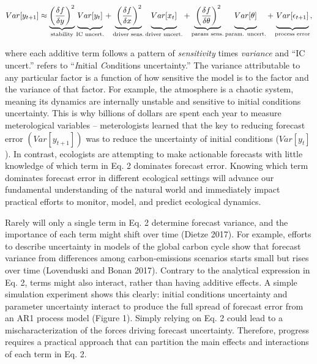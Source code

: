 \documentclass[12pt,]{article}
\begin{document}
\begin{align}
Var[y_{t+1}] \approx \underbrace{\left(\frac{\delta f}{\delta y} \right)^2}_{\text{stability}} 
               \underbrace{\vphantom{ \left(\frac{\delta f}{\delta y} \right)^2 } Var[y_t]}_{\text{IC uncert.}} +
               \underbrace{\vphantom{ \left(\frac{\delta f}{\delta y} \right)^2 }\left(\frac{\delta f}{\delta x} \right)^2}_{\text{driver sens.}} 
               \underbrace{\vphantom{ \left(\frac{\delta f}{\delta y} \right)^2 } Var[x_t]}_{\text{driver uncert.}} +
               \underbrace{\vphantom{ \left(\frac{\delta f}{\delta y} \right)^2 }\left(\frac{\delta f}{\delta \theta} \right)^2}_{\text{param sens.}}
               \underbrace{\vphantom{ \left(\frac{\delta f}{\delta y} \right)^2 } Var[\theta]}_{\text{param. uncert.}} +
               \underbrace{\vphantom{ \left(\frac{\delta f}{\delta y} \right)^2 } Var[\epsilon_{t+1}]}_{\text{process error}},
\end{align}

where each additive term follows a pattern of \emph{sensitivity} times
\emph{variance} and ``IC uncert.'' refers to ``\emph{I}nitial
\emph{C}onditions uncertainty.'' The variance attributable to any
particular factor is a function of how sensitive the model is to the
factor and the variance of that factor. For example, the atmosphere is a
chaotic system, meaning its dynamics are internally unstable and
sensitive to initial conditions uncertainty. This is why billions of
dollars are spent each year to measure meterological variables --
meterologists learned that the key to reducing forecast error
\((Var[y_{t+1}])\) was to reduce the uncertainty of initial conditions
(\(Var[y_t]\)). In contrast, ecologists are attempting to make
actionable forecasts with little knowledge of which term in Eq. 2
dominates forecast error. Knowing which term dominates forecast error in
different ecological settings will advance our fundamental understanding
of the natural world and immediately impact practical efforts to
monitor, model, and predict ecological dynamics.

Rarely will only a single term in Eq. 2 determine forecast variance, and
the importance of each term might shift over time (Dietze 2017). For
example, efforts to describe uncertainty in models of the global carbon
cycle show that forecast variance from differences among
carbon-emissions scenarios starts small but rises over time (Lovenduski
and Bonan 2017). Contrary to the analytical expression in Eq. 2, terms
might also interact, rather than having additive effects. A simple
simulation experiment shows this clearly: initial conditions uncertainty
and parameter uncertainty interact to produce the full spread of
forecast error from an AR1 process model (Figure 1). Simply relying on
Eq. 2 could lead to a mischaracterization of the forces driving forecast
uncertainty. Therefore, progress requires a practical approach that can
partition the main effects and interactions of each term in Eq. 2.
\end{document}
